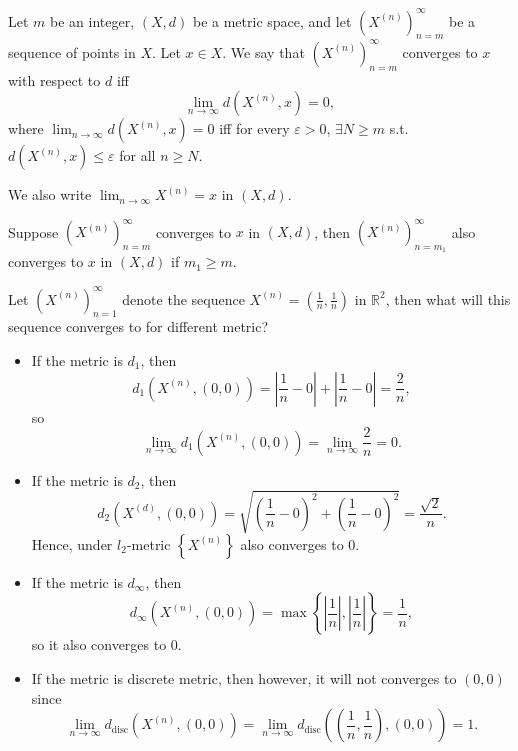 \begin{definition} \label{def: convergence in metric space}
    Let \(m\) be an integer, \((X, d)\) be a metric space, and let \(\left( X^{(n)} \right)_{n=m}^{\infty}\) be a sequence of points in \(X\). Let \(x \in X\). We say that \(\left( X^{(n)} \right)_{n=m}^{\infty}  \) converges to \(x\) with respect to \(d\) iff 
    \[
        \lim_{n \to \infty} d\left( X^{(n)}, x \right) = 0,
    \] 
    where \(\lim_{n \to \infty} d\left( X^{(n)} , x\right) = 0 \) iff for every \(\varepsilon > 0\), \(\exists N \ge m\) s.t. \(d \left( X^{(n)}, x \right) \le \varepsilon  \) for all \(n \ge N\). 
    \begin{notation}
        We also write \(\lim_{n \to \infty} X^{(n)} = x\) in \((X, d)\).  
    \end{notation}    
\end{definition}
\begin{remark}
    Suppose \(\left( X^{(n)} \right)_{n=m}^{\infty}  \) converges to \(x\) in \((X, d)\), then \(\left( X^{(n)} \right)_{n = m_1}^{\infty}  \) also converges to \(x\) in \((X, d)\) if \(m_1 \ge m\).       
\end{remark}

\begin{eg}
    Let \(\left( X^{(n)} \right)_{n=1}^{\infty}  \) denote the sequence \(X^{(n)} = (\frac{1}{n}, \frac{1}{n})\) in \(\mathbb{R} ^2\), then what will this sequence converges to  for different metric?   
\end{eg}
\begin{explanation}
    \vphantom{text}
    \begin{itemize}
        \item If the metric is \(d_1\), then 
        \[
            d_1 \left( X^{(n)}, (0, 0) \right) = \left\vert \frac{1}{n} - 0 \right\vert + \left\vert \frac{1}{n} - 0\right\vert = \frac{2}{n},   
        \] so 
        \[
            \lim_{n \to \infty} d_1 \left( X^{(n)}, (0, 0) \right) = \lim_{n \to \infty} \frac{2}{n} = 0.  
        \]
        \item If the metric is \(d_2\), then 
        \[
            d_2 \left( X^{(d)}, (0, 0) \right) = \sqrt{\left( \frac{1}{n} - 0 \right)^2 + \left( \frac{1}{n} - 0 \right)^2 } = \frac{\sqrt{2}}{n}.   
        \]
        Hence, under \(l_2\)-metric \(\left\{ X^{(n)} \right\} \) also converges to \(0\).   
        \item If the metric is \(d_\infty \), then 
        \[
            d_\infty \left( X^{(n)}, (0, 0) \right) = \max \left\{ \left\vert \frac{1}{n} \right\vert, \left\vert \frac{1}{n} \right\vert   \right\} = \frac{1}{n},  
        \] so it also converges to \(0\). 
        \item If the metric is discrete metric, then however, it will not converges to \((0, 0)\) since 
        \[
            \lim_{n \to \infty} d_{\text{disc}} \left( X^{(n)}, (0, 0) \right) = \lim_{n \to \infty}  d_{\text{disc}} \left( \left( \frac{1}{n}, \frac{1}{n} \right) , (0, 0) \right) = 1. 
        \] 
    \end{itemize}
\end{explanation}

